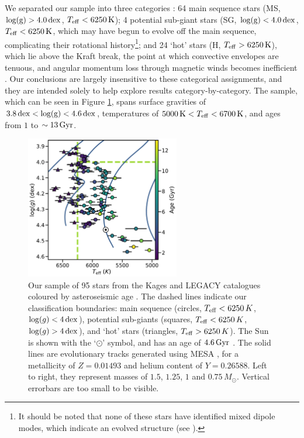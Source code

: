 \documentclass[12pt]{article}
\newcommand{\teff}{\mbox{$T_{\rm eff}$}\xspace}
\newcommand{\logg}{\mbox{$\log(g)$}\xspace}
\begin{document}
We separated our sample into three categories \cite{garcia+2014}: 64 main sequence stars (MS, $\rm{log(g)} > 4.0\, \rm dex$, $T_{\rm eff} < 6250\, \rm K$); 4 potential sub-giant stars (SG, $\rm{log(g)} < 4.0\, \rm dex$, $T_{\rm eff} < 6250\, \rm K$, which may have begun to evolve off the main sequence, complicating their rotational history\footnote{It should be noted that none of these stars have identified mixed dipole modes, which indicate an evolved structure (see \cite{bedding+2010}).}; and 24 `hot' stars (H, $T_{\rm eff} > 6250\, \rm K$), which lie above the Kraft break, the point at which convective envelopes are tenuous, and angular momentum loss through magnetic winds becomes inefficient \cite{kraft1967}. Our conclusions are largely insensitive to these categorical assignments, and they are intended solely to help explore results category-by-category. The sample, which can be seen in Figure \ref{fig:sample}, spans surface gravities of $3.8\, \rm{dex} < \rm{log(g)} < 4.6\, \rm{dex}$, temperatures of $5000\, \textrm{K} < T_{\rm eff} <  6700\, \rm{K}$, and ages from $1$ to $\sim 13\, \rm{Gyr}$.\\

\begin{figure}
	\centering
	\includegraphics[width=0.6\textwidth]{data.pdf}
	\caption{Our sample of 95 stars from the Kages and LEGACY catalogues coloured by asteroseismic age  \cite{silvaaguirre+2015, silvaaguirre+2017}. The dashed lines indicate our classification boundaries: main sequence (circles, $\teff < 6250\, K$, $\logg < 4\, \rm{dex}$), potential sub-giants (squares, $\teff < 6250\, K$, $\logg > 4\, \rm{dex}$), and `hot' stars (triangles, $\teff > 6250\, K$). The Sun is shown with the `$\odot$' symbol, and has an age of $4.6\, \rm{Gyr}$ \cite{bonanno+frohlich2015}. The solid lines are evolutionary tracks generated using MESA \cite{paxton+2017}, for a metallicity of $Z = 0.01493$ and helium content of $Y = 0.26588$. Left to right, they represent masses of $1.5$, $1.25$, $1$ and $0.75\, M_\odot$. Vertical errorbars are too small to be visible.}
	\label{fig:sample}
\end{figure}
\end{document}
